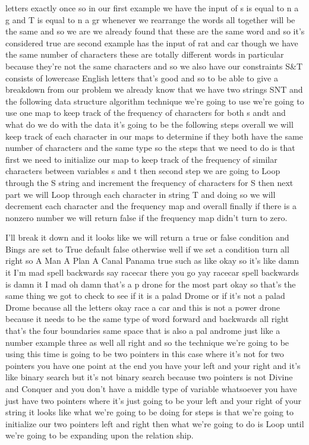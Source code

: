 \expandafter\def\csname sourceexcerpt@64\endcsname{%
letters exactly once so in our first example we have the input of s is equal to n a g
and T is equal to n a gr whenever we rearrange the words all together will be the same
and so we are we already found that these are the same word and so it's considered
true are second example has the input of rat and car though we have the same number of
characters these are totally different words in particular because they're not the
same characters and so we also have our constraints S\&T consists of lowercase English
letters that's good and so to be able to give a breakdown from our problem we already
know that we have two strings SNT and the following data structure algorithm technique
we're going to use we're going to use one map to keep track of the frequency of
characters for both s andt and what do we do with the data it's going to be the
following steps overall we will keep track of each character in our maps to determine
if they both have the same number of characters and the same type so the steps that we
need to do is that first we need to initialize our map to keep track of the frequency
of similar characters between variables s and t then second step we are going to Loop
through the S string and increment the frequency of characters for S then next part we
will Loop through each character in string T and doing so we will decrement each
character and the frequency map and overall finally if there is a nonzero number we
will return false if the frequency map didn't turn to zero.
}

\expandafter\def\csname sourceexcerpt@65\endcsname{%
I'll break it down and it looks like we will return a true or false condition and
Bings are set to True default false otherwise well if we set a condition turn all
right so A Man A Plan A Canal Panama true such as like okay so it's like damn it I'm
mad spell backwards say racecar there you go yay racecar spell
backwards is damn it I mad oh damn that's a p drone for the most part okay so that's
the same thing we got to check to see if it is a palad Drome or if it's not a palad
Drome because all the letters okay race a car and this is not a power drone because it
needs to be the same type of word forward and backwards all right that's the four boundaries same
space that is also a pal androme just like a number example three as well all right
and so the technique we're going to be using this time is going to be two pointers in
this case where it's not for two pointers you have one point at the end you have your
left and your right and it's like binary search but it's not binary search because two
pointers is not Divine and Conquer and you don't have a middle type of variable
whatsoever you have just have two pointers where it's just going to be your left and
your right of your string it looks like what we're going to be doing for steps is that
we're going to initialize our two pointers left and right then what we're going to do
is Loop until we're going to be expanding upon the relation ship.
}

